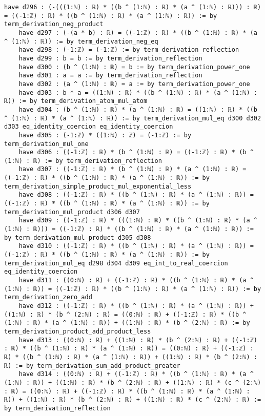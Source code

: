 \documentclass{article}
\begin{document}
\begin{tcolorbox}[colback=white!10, width=\linewidth]
\begin{lstlisting}[language=Lean4]
    have d296 : (-(((1:ℕ) : ℝ) * ((b ^ (1:ℕ) : ℝ) * (a ^ (1:ℕ) : ℝ))) : ℝ) = ((-1:ℤ) : ℝ) * ((b ^ (1:ℕ) : ℝ) * (a ^ (1:ℕ) : ℝ)) := by term_derivation_neg_product
    have d297 : (-(a * b) : ℝ) = ((-1:ℤ) : ℝ) * ((b ^ (1:ℕ) : ℝ) * (a ^ (1:ℕ) : ℝ)) := by term_derivation_neg_eq
    have d298 : (-1:ℤ) = (-1:ℤ) := by term_derivation_reflection
    have d299 : b = b := by term_derivation_reflection
    have d300 : (b ^ (1:ℕ) : ℝ) = b := by term_derivation_power_one
    have d301 : a = a := by term_derivation_reflection
    have d302 : (a ^ (1:ℕ) : ℝ) = a := by term_derivation_power_one
    have d303 : b * a = ((1:ℕ) : ℝ) * ((b ^ (1:ℕ) : ℝ) * (a ^ (1:ℕ) : ℝ)) := by term_derivation_atom_mul_atom
    have d304 : (b ^ (1:ℕ) : ℝ) * (a ^ (1:ℕ) : ℝ) = ((1:ℕ) : ℝ) * ((b ^ (1:ℕ) : ℝ) * (a ^ (1:ℕ) : ℝ)) := by term_derivation_mul_eq d300 d302 d303 eq_identity_coercion eq_identity_coercion
    have d305 : (-1:ℤ) * ((1:ℕ) : ℤ) = (-1:ℤ) := by term_derivation_mul_one
    have d306 : ((-1:ℤ) : ℝ) * (b ^ (1:ℕ) : ℝ) = ((-1:ℤ) : ℝ) * (b ^ (1:ℕ) : ℝ) := by term_derivation_reflection
    have d307 : ((-1:ℤ) : ℝ) * (b ^ (1:ℕ) : ℝ) * (a ^ (1:ℕ) : ℝ) = ((-1:ℤ) : ℝ) * ((b ^ (1:ℕ) : ℝ) * (a ^ (1:ℕ) : ℝ)) := by term_derivation_simple_product_mul_exponential_less
    have d308 : ((-1:ℤ) : ℝ) * ((b ^ (1:ℕ) : ℝ) * (a ^ (1:ℕ) : ℝ)) = ((-1:ℤ) : ℝ) * ((b ^ (1:ℕ) : ℝ) * (a ^ (1:ℕ) : ℝ)) := by term_derivation_mul_product d306 d307
    have d309 : ((-1:ℤ) : ℝ) * (((1:ℕ) : ℝ) * ((b ^ (1:ℕ) : ℝ) * (a ^ (1:ℕ) : ℝ))) = ((-1:ℤ) : ℝ) * ((b ^ (1:ℕ) : ℝ) * (a ^ (1:ℕ) : ℝ)) := by term_derivation_mul_product d305 d308
    have d310 : ((-1:ℤ) : ℝ) * ((b ^ (1:ℕ) : ℝ) * (a ^ (1:ℕ) : ℝ)) = ((-1:ℤ) : ℝ) * ((b ^ (1:ℕ) : ℝ) * (a ^ (1:ℕ) : ℝ)) := by term_derivation_mul_eq d298 d304 d309 eq_int_to_real_coercion eq_identity_coercion
    have d311 : ((0:ℕ) : ℝ) + ((-1:ℤ) : ℝ) * ((b ^ (1:ℕ) : ℝ) * (a ^ (1:ℕ) : ℝ)) = ((-1:ℤ) : ℝ) * ((b ^ (1:ℕ) : ℝ) * (a ^ (1:ℕ) : ℝ)) := by term_derivation_zero_add
    have d312 : ((-1:ℤ) : ℝ) * ((b ^ (1:ℕ) : ℝ) * (a ^ (1:ℕ) : ℝ)) + ((1:ℕ) : ℝ) * (b ^ (2:ℕ) : ℝ) = ((0:ℕ) : ℝ) + ((-1:ℤ) : ℝ) * ((b ^ (1:ℕ) : ℝ) * (a ^ (1:ℕ) : ℝ)) + ((1:ℕ) : ℝ) * (b ^ (2:ℕ) : ℝ) := by term_derivation_product_add_product_less
    have d313 : ((0:ℕ) : ℝ) + ((1:ℕ) : ℝ) * (b ^ (2:ℕ) : ℝ) + ((-1:ℤ) : ℝ) * ((b ^ (1:ℕ) : ℝ) * (a ^ (1:ℕ) : ℝ)) = ((0:ℕ) : ℝ) + ((-1:ℤ) : ℝ) * ((b ^ (1:ℕ) : ℝ) * (a ^ (1:ℕ) : ℝ)) + ((1:ℕ) : ℝ) * (b ^ (2:ℕ) : ℝ) := by term_derivation_sum_add_product_greater
    have d314 : ((0:ℕ) : ℝ) + ((-1:ℤ) : ℝ) * ((b ^ (1:ℕ) : ℝ) * (a ^ (1:ℕ) : ℝ)) + ((1:ℕ) : ℝ) * (b ^ (2:ℕ) : ℝ) + ((1:ℕ) : ℝ) * (c ^ (2:ℕ) : ℝ) = ((0:ℕ) : ℝ) + ((-1:ℤ) : ℝ) * ((b ^ (1:ℕ) : ℝ) * (a ^ (1:ℕ) : ℝ)) + ((1:ℕ) : ℝ) * (b ^ (2:ℕ) : ℝ) + ((1:ℕ) : ℝ) * (c ^ (2:ℕ) : ℝ) := by term_derivation_reflection

\end{lstlisting}
\end{tcolorbox}
\end{document}
